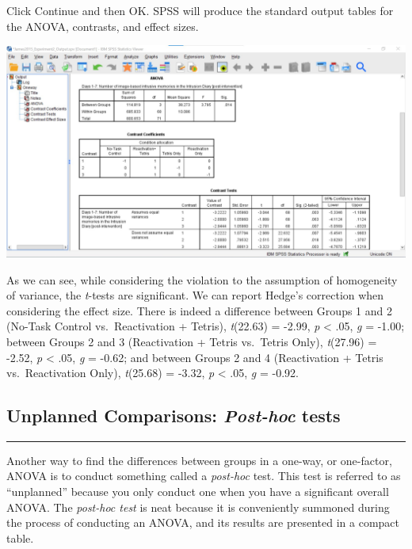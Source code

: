 \documentclass[
]{book}
\begin{document}
Click {Continue} and then {OK}. SPSS will produce the standard output tables for the ANOVA, contrasts, and effect sizes.

\includegraphics{img/8.6.4.32.png}

As we can see, while considering the violation to the assumption of homogeneity of variance, the \emph{t}-tests are significant. We can report Hedge's correction when considering the effect size. There is indeed a difference between Groups 1 and 2 (No-Task Control vs.~Reactivation + Tetris), \emph{t}(22.63) = -2.99, \emph{p} \textless{} .05, \emph{g} = -1.00; between Groups 2 and 3 (Reactivation + Tetris vs.~Tetris Only), \emph{t}(27.96) = -2.52, \emph{p} \textless{} .05, \emph{g} = -0.62; and between Groups 2 and 4 (Reactivation + Tetris vs.~Reactivation Only), \emph{t}(25.68) = -3.32, \emph{p} \textless{} .05, \emph{g} = -0.92.

\hypertarget{unplanned-comparisons-post-hoc-tests}{%
\subsection{\texorpdfstring{Unplanned Comparisons: \emph{Post-hoc} tests}{Unplanned Comparisons: Post-hoc tests}}\label{unplanned-comparisons-post-hoc-tests}}

\begin{center}\rule{0.5\linewidth}{0.5pt}\end{center}

Another way to find the differences between groups in a one-way, or one-factor, ANOVA is to conduct something called a \emph{post-hoc} test. This test is referred to as ``unplanned'' because you only conduct one when you have a significant overall ANOVA. The \emph{post-hoc test} is neat because it is conveniently summoned during the process of conducting an ANOVA, and its results are presented in a compact table.
\end{document}
